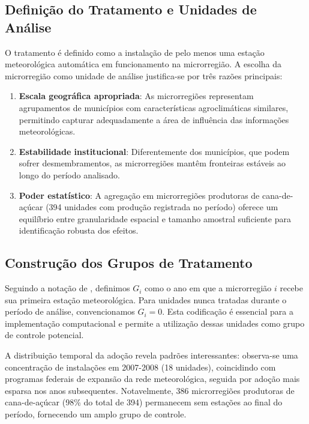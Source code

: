 \documentclass[
	12pt,				%
	openright,			%
	oneside,			%
	a4paper,			%
	english,			%
	french,				%
	spanish,			%
	brazil				%
	]{abntex2}
\begin{document}
\subsection{Definição do Tratamento e Unidades de Análise}

O tratamento é definido como a instalação de pelo menos uma estação meteorológica automática em funcionamento na microrregião. A escolha da microrregião como unidade de análise justifica-se por três razões principais:

\begin{enumerate}
\item \textbf{Escala geográfica apropriada}: As microrregiões representam agrupamentos de municípios com características agroclimáticas similares, permitindo capturar adequadamente a área de influência das informações meteorológicas.

\item \textbf{Estabilidade institucional}: Diferentemente dos municípios, que podem sofrer desmembramentos, as microrregiões mantêm fronteiras estáveis ao longo do período analisado.

\item \textbf{Poder estatístico}: A agregação em microrregiões produtoras de cana-de-açúcar (394 unidades com produção registrada no período) oferece um equilíbrio entre granularidade espacial e tamanho amostral suficiente para identificação robusta dos efeitos.
\end{enumerate}

\subsection{Construção dos Grupos de Tratamento}

Seguindo a notação de , definimos $G_i$ como o ano em que a microrregião $i$ recebe sua primeira estação meteorológica. Para unidades nunca tratadas durante o período de análise, convencionamos $G_i = 0$. Esta codificação é essencial para a implementação computacional e permite a utilização dessas unidades como grupo de controle potencial.

A distribuição temporal da adoção revela padrões interessantes: observa-se uma concentração de instalações em 2007-2008 (18 unidades), coincidindo com programas federais de expansão da rede meteorológica, seguida por adoção mais esparsa nos anos subsequentes. Notavelmente, 386 microrregiões produtoras de cana-de-açúcar (98\% do total de 394) permanecem sem estações ao final do período, fornecendo um amplo grupo de controle.
\end{document}
